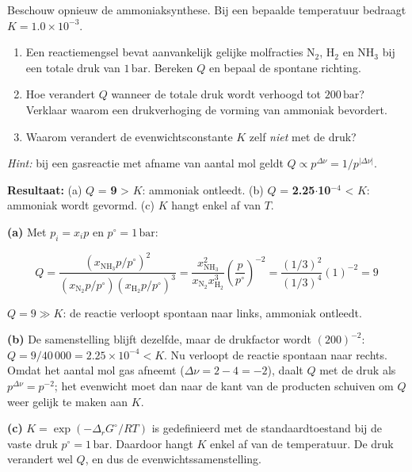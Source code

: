 \begin{oefening}\label{oef:h6-3}
Beschouw opnieuw de ammoniaksynthese. Bij een bepaalde temperatuur bedraagt \(K = 1.0\times10^{-3}\).

\begin{enumerate}
\item[(a)]
  Een reactiemengsel bevat aanvankelijk gelijke molfracties \(\mathrm{N_2}\), \(\mathrm{H_2}\) en \(\mathrm{NH_3}\) bij een totale druk van \(1\,\mathrm{bar}\). Bereken \(Q\) en bepaal de spontane richting.
\item[(b)]
  Hoe verandert \(Q\) wanneer de totale druk wordt verhoogd tot \(200\,\mathrm{bar}\)? Verklaar waarom een drukverhoging de vorming van ammoniak bevordert.
\item[(c)]
  Waarom verandert de evenwichtsconstante \(K\) zelf \emph{niet} met de druk?
\end{enumerate}

\emph{Hint:} bij een gasreactie met afname van aantal mol geldt \(Q \propto p^{\Delta \nu} = 1/p^{|\Delta \nu|}\).
\end{oefening}
\begin{oplossing}
\textbf{Resultaat:} (a) \(Q\) = \textbf{9} \textgreater{} \(K\): ammoniak ontleedt. (b) \(Q\) = \textbf{2.25\ensuremath{\cdot{}}10\ensuremath{^{-4}}} \textless{} \(K\): ammoniak wordt gevormd. (c) \(K\) hangt enkel af van \(T\).

\textbf{(a)} Met \(p_i = x_i p\) en \(p^\circ = 1\,\mathrm{bar}\):

\[
Q = \frac{(x_{\mathrm{NH_3}}p/p^\circ)^2}{(x_{\mathrm{N_2}}p/p^\circ)(x_{\mathrm{H_2}}p/p^\circ)^3} = \frac{x_{\mathrm{NH_3}}^2}{x_{\mathrm{N_2}}x_{\mathrm{H_2}}^3}\left(\frac{p}{p^\circ}\right)^{-2} = \frac{(1/3)^2}{(1/3)^4}(1)^{-2} = 9
\]

\(Q = 9 \gg K\): de reactie verloopt spontaan naar links, ammoniak ontleedt.

\textbf{(b)} De samenstelling blijft dezelfde, maar de drukfactor wordt \((200)^{-2}\): \(Q = 9/40\,000 = 2.25\times10^{-4} < K\). Nu verloopt de reactie spontaan naar rechts. Omdat het aantal mol gas afneemt (\(\Delta\nu = 2 - 4 = -2\)), daalt \(Q\) met de druk als \(p^{\Delta\nu} = p^{-2}\); het evenwicht moet dan naar de kant van de producten schuiven om \(Q\) weer gelijk te maken aan \(K\).

\textbf{(c)} \(K = \exp(-\Delta_r G^\circ/RT)\) is gedefinieerd met de standaardtoestand bij de vaste druk \(p^\circ = 1\,\mathrm{bar}\). Daardoor hangt \(K\) enkel af van de temperatuur. De druk verandert wel \(Q\), en dus de evenwichtssamenstelling.
\end{oplossing}

